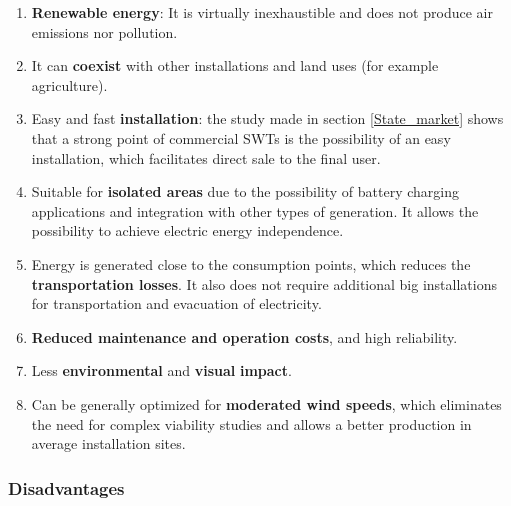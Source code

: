 \documentclass[../TFG_Report.tex]{subfiles}
\begin{document}
\begin{enumerate}
	\item \textbf{Renewable energy}: It is virtually inexhaustible and does not produce air emissions nor pollution. 
	
	\item It can \textbf{coexist} with other installations and land uses (for example agriculture).
	
	\item Easy and fast \textbf{installation}: the study made in section \ref{State_market} shows that a strong point of commercial SWTs is the possibility of an easy installation, which facilitates direct sale to the final user.
	 
	\item Suitable for \textbf{isolated areas} due to the possibility of battery charging applications and integration with other types of generation. It allows the possibility to achieve electric energy independence. 
	
	\item Energy is generated close to the consumption points, which reduces the \textbf{transportation losses}. It also does not require additional big installations for transportation and evacuation of electricity.
	
	\item \textbf{Reduced maintenance and operation costs}, and high reliability. 
	  
	\item Less \textbf{environmental} and \textbf{visual} \textbf{impact}. 
	
	\item Can be generally optimized for \textbf{moderated wind speeds}, which eliminates the need for complex viability studies and allows a better production in average installation sites. 
	
\end{enumerate}


\subsubsection*{Disadvantages}
\end{document}
